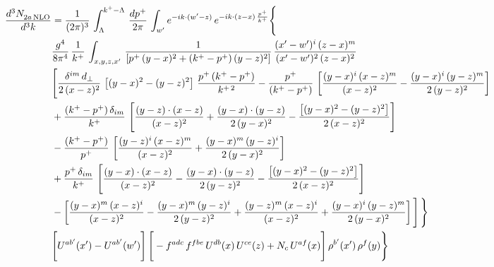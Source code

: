 \documentclass[9pt]{article}
\numberwithin{equation}{section}
\begin{document}
\begin{align}
    \frac{d^{3}N_{2a\,\rm NLO}^{\rm}}{d^{3}k}  & =  \frac{1}{(2\pi)^{3}}\,\int_{\Lambda}^{k^{+}-\Lambda}\, \frac{dp^{+}}{2\pi} \,  \int_{w^\prime} e^{-ik\cdot(w'-z)}\,e^{-ik\cdot (z-x)\,\frac{p^{+}}{k^{+}}} \Bigg\{\notag \\ & \frac{g^{4}}{8\pi^{4}}\,\frac{1}{k^{+}}\, \int_{x,y,z,x'}\,\frac{1}{\left[p^{+}\,(y-x)^{2}+(k^{+}-p^{+})\,(y-z)^{2}\right]}\, \frac{(x'-w')^{i}\,(z-x)^{m}}{(x'-w')^{2}\,(z-x)^{2}} \notag \\ & \Bigg[\frac{\delta^{im}\,d_{\perp}}{2\,(x-z)^{2}}\,\left[(y-x)^{2}-(y-z)^{2}\right]\,\frac{p^{+}\,(k^{+}-p^{+})}{k^{+\,2}}-\frac{p^{+}}{(k^{+}-p^{+})}\,\left[\frac{(y-x)^{i}\,(x-z)^{m}}{(x-z)^{2}}-\frac{(y-x)^{i}\,(y-z)^{m}}{2\,(y-z)^{2}}\right]\notag \\ & +\frac{(k^{+}-p^{+})\,\delta_{im}}{k^{+}}\,\left[\frac{(y-z)\cdot (x-z)}{(x-z)^{2}}+\frac{(y-x)\cdot (y-z)}{2\,(y-x)^{2}}-\frac{\left[(y-x)^{2}-(y-z)^{2}\right]}{2\,(x-z)^{2}}\right]\notag \\ & -\frac{(k^{+}-p^{+})}{p^{+}}\,\left[\frac{(y-z)^{i}\,(x-z)^{m}}{(x-z)^{2}}+\frac{(y-x)^{m}\,(y-z)^{i}}{2\,(y-x)^{2}}\right]\notag \\ & +\frac{p^{+}\,\delta_{im}}{k^{+}}\,\left[\frac{(y-x)\cdot (x-z)}{(x-z)^{2}}-\frac{(y-x)\cdot (y-z)}{2\,(y-z)^{2}}-\frac{\left[(y-x)^{2}-(y-z)^{2}\right]}{2\,(x-z)^{2}}\right]\notag \\ &-\left[\frac{(y-x)^{m}\,(x-z)^{i}}{(x-z)^{2}}-\frac{(y-x)^{m}\,(y-z)^{i}}{2\,(y-z)^{2}}+\frac{(y-z)^{m}\,(x-z)^{i}}{(x-z)^{2}}+\frac{(y-x)^{i}\,(y-z)^{m}}{2\,(y-x)^{2}}\right]\Bigg]\,\Bigg\} \notag \\ & \Bigg[U^{ab'}(x')-U^{ab'}(w')\Bigg]\,\Bigg[-f^{adc}\,f^{fbe}\,U^{db}(x)\,U^{ce}(z)+N_{c}\,U^{af}(x)\Bigg]\,\rho^{b'}(x')\,\rho^{f}(y)\Bigg\}
\end{align}
\end{document}
